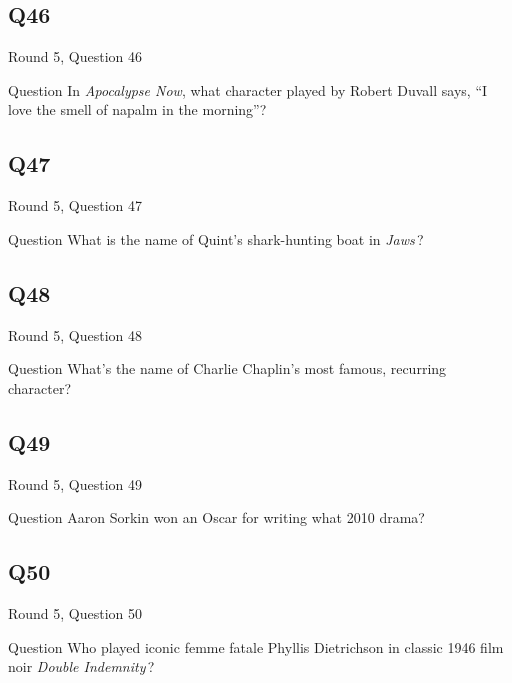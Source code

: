 \documentclass[11pt]{beamer}
\begin{document}
\subsection*{Q46}
\begin{frame}[t]{Round 5, Question 46}
  \vspace{2em}
  \begin{block}{Question}
    In \emph{Apocalypse Now}, what character played by Robert Duvall says, ``I love the smell of napalm in the morning''?
  \end{block}
\end{frame}


\subsection*{Q47}
\begin{frame}[t]{Round 5, Question 47}
  \vspace{2em}
  \begin{block}{Question}
    What is the name of Quint's shark-hunting boat in \emph{Jaws}\,?
  \end{block}
\end{frame}


\subsection*{Q48}
\begin{frame}[t]{Round 5, Question 48}
  \vspace{2em}
  \begin{block}{Question}
    What's the name of Charlie Chaplin's most famous, recurring character?
  \end{block}
\end{frame}


\subsection*{Q49}
\begin{frame}[t]{Round 5, Question 49}
  \vspace{2em}
  \begin{block}{Question}
    Aaron Sorkin won an Oscar for writing what 2010 drama?
  \end{block}
\end{frame}


\subsection*{Q50}
\begin{frame}[t]{Round 5, Question 50}
  \vspace{2em}
  \begin{block}{Question}
    Who played iconic femme fatale Phyllis Dietrichson in classic 1946 film noir \emph{Double Indemnity}\,?
  \end{block}
\end{frame}
\end{document}
